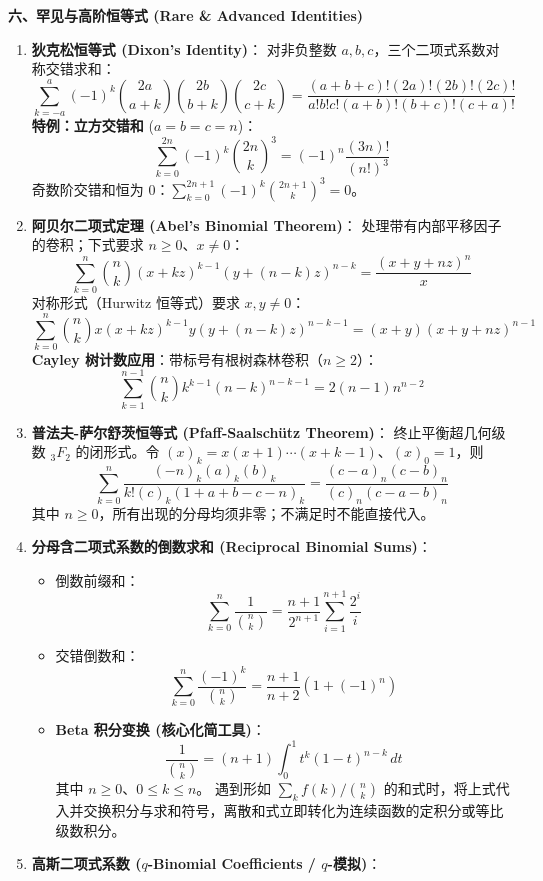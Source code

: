 \textbf{六、罕见与高阶恒等式 (Rare \& Advanced Identities)}
\begin{enumerate}
    \item \textbf{狄克松恒等式 (Dixon's Identity)}：
    对非负整数 $a,b,c$，三个二项式系数对称交错求和：
    \[
    \sum_{k=-a}^a (-1)^k \binom{2a}{a+k} \binom{2b}{b+k} \binom{2c}{c+k} = \frac{(a+b+c)! (2a)! (2b)! (2c)!}{a! b! c! (a+b)! (b+c)! (c+a)!}
    \]
    \textbf{特例：立方交错和} ($a = b = c = n$)：
    \[
    \sum_{k=0}^{2n} (-1)^k \binom{2n}{k}^3 = (-1)^n \frac{(3n)!}{(n!)^3}
    \]
    奇数阶交错和恒为 $0$：$\sum_{k=0}^{2n+1} (-1)^k \binom{2n+1}{k}^3 = 0$。
    \item \textbf{阿贝尔二项式定理 (Abel's Binomial Theorem)}：
    处理带有内部平移因子的卷积；下式要求 $n\ge0$、$x\ne0$：
    \[
    \sum_{k=0}^n \binom{n}{k} (x + kz)^{k-1} (y + (n-k)z)^{n-k} = \frac{(x+y+nz)^n}{x}
    \]
    对称形式（Hurwitz 恒等式）要求 $x,y\ne0$：
    \[
    \sum_{k=0}^n \binom{n}{k} x (x+kz)^{k-1} y (y+(n-k)z)^{n-k-1} = (x+y) (x+y+nz)^{n-1}
    \]
    \textbf{Cayley 树计数应用}：带标号有根树森林卷积（$n\ge2$）：
    \[
    \sum_{k=1}^{n-1} \binom{n}{k} k^{k-1} (n-k)^{n-k-1} = 2(n-1)n^{n-2}
    \]
    \item \textbf{普法夫-萨尔舒茨恒等式 (Pfaff-Saalschütz Theorem)}：
    终止平衡超几何级数 $_3F_2$ 的闭形式。令 $(x)_k=x(x+1)\cdots(x+k-1)$、$(x)_0=1$，则
    \[
    \sum_{k=0}^n \frac{(-n)_k (a)_k (b)_k}{k! (c)_k (1+a+b-c-n)_k} = \frac{(c-a)_n (c-b)_n}{(c)_n (c-a-b)_n}
    \]
    其中 $n\ge 0$，所有出现的分母均须非零；不满足时不能直接代入。
    \item \textbf{分母含二项式系数的倒数求和 (Reciprocal Binomial Sums)}：
    \begin{itemize}
        \item 倒数前缀和：
        \[
        \sum_{k=0}^n \frac{1}{\binom{n}{k}} = \frac{n+1}{2^{n+1}} \sum_{i=1}^{n+1} \frac{2^i}{i}
        \]
        \item 交错倒数和：
        \[
        \sum_{k=0}^n \frac{(-1)^k}{\binom{n}{k}} = \frac{n+1}{n+2} (1 + (-1)^n)
        \]
        \item \textbf{Beta 积分变换 (核心化简工具)}：
        \[
        \frac{1}{\binom{n}{k}} = (n+1) \int_0^1 t^k (1-t)^{n-k} \, dt
        \]
        其中 $n\ge0$、$0\le k\le n$。
        遇到形如 $\sum_k f(k) / \binom{n}{k}$ 的和式时，将上式代入并交换积分与求和符号，离散和式立即转化为连续函数的定积分或等比级数积分。
    \end{itemize}
    \item \textbf{高斯二项式系数 ($q$-Binomial Coefficients / $q$-模拟)}：

\end{enumerate}
